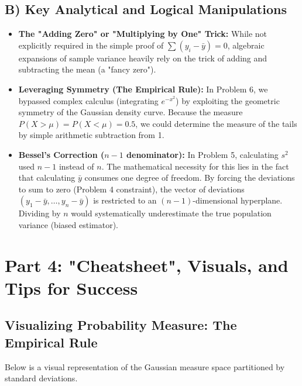 \documentclass[11pt]{article}
\theoremstyle{definition}
\theoremstyle{remark}
\newcommand{\samplemean}{\bar{y}}
\begin{document}
\subsection{B) Key Analytical and Logical Manipulations}
\begin{itemize}
    \item \textbf{The "Adding Zero" or "Multiplying by One" Trick:} While not explicitly required in the simple proof of $\sum (y_i - \samplemean) = 0$, algebraic expansions of sample variance heavily rely on the trick of adding and subtracting the mean (a "fancy zero").
    \item \textbf{Leveraging Symmetry (The Empirical Rule):} In Problem 6, we bypassed complex calculus (integrating $e^{-x^2}$) by exploiting the geometric symmetry of the Gaussian density curve. Because the measure $P(X > \mu) = P(X < \mu) = 0.5$, we could determine the measure of the tails by simple arithmetic subtraction from 1. 
    \item \textbf{Bessel's Correction ($n-1$ denominator):} In Problem 5, calculating $s^2$ used $n-1$ instead of $n$. The mathematical necessity for this lies in the fact that calculating $\samplemean$ consumes one degree of freedom. By forcing the deviations to sum to zero (Problem 4 constraint), the vector of deviations $(y_1 - \samplemean, \dots, y_n - \samplemean)$ is restricted to an $(n-1)$-dimensional hyperplane. Dividing by $n$ would systematically underestimate the true population variance (biased estimator).
\end{itemize}


\section{Part 4: "Cheatsheet", Visuals, and Tips for Success}

\subsection{Visualizing Probability Measure: The Empirical Rule}
Below is a visual representation of the Gaussian measure space partitioned by standard deviations.
\end{document}
